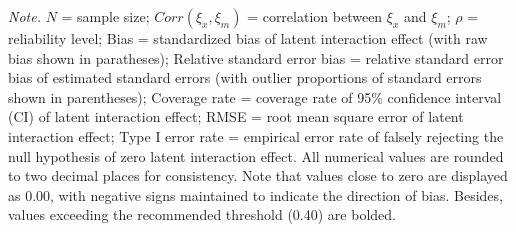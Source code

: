 \documentclass[
  man,mask]{apa6}
\newenvironment{lltable}{\begin{landscape}\centering\begin{ThreePartTable}}{\end{ThreePartTable}\end{landscape}}
\begin{document}
\begin{lltable}

\begin{TableNotes}[para]
\normalsize{\textit{Note.} $\textit{N}$ = sample size; $Corr(\xi_{x}, \xi_{m})$ = correlation between $\xi_{x}$ and $\xi_{m}$; $\rho$ = reliability level; Bias = standardized bias of latent interaction effect (with raw bias shown in paratheses); Relative standard error bias = relative standard error bias of estimated standard errors (with outlier proportions of standard errors shown in parentheses); Coverage rate = coverage rate of 95$\%$ confidence interval (CI) of latent interaction effect; RMSE = root mean square error of latent interaction effect; Type I error rate = empirical error rate of falsely rejecting the null hypothesis of zero latent interaction effect. All numerical values are rounded to two decimal places for consistency. Note that values close to zero are displayed as 0.00, with negative signs maintained to indicate the direction of bias. Besides, values exceeding the recommended threshold (0.40) are bolded.}
\end{TableNotes}

\tiny{

}
\end{lltable}
\end{document}
